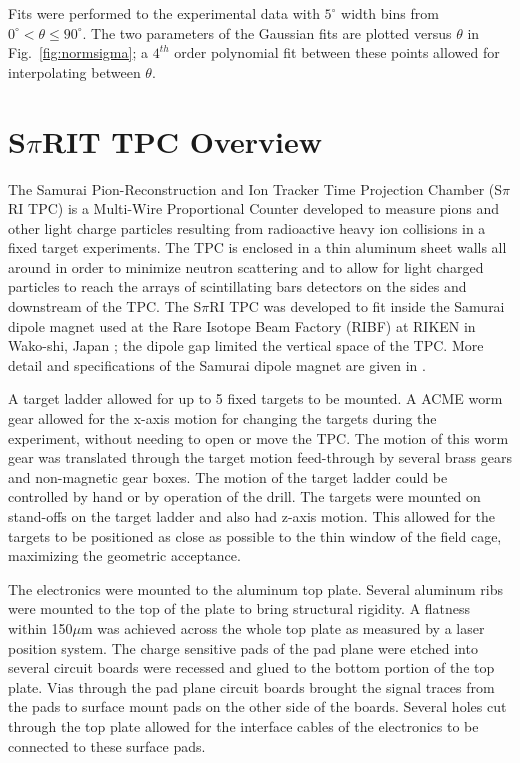 Fits were performed to the experimental data with  $5^{\circ}$ width bins from $0^{\circ} < \theta \leq 90^{\circ}$. The two parameters of the Gaussian fits are plotted versus $\theta$ in Fig.~\ref{fig:normsigma}; a $4^{th}$ order polynomial fit between these points allowed for interpolating between $\theta$.




\section{S$\pi$RIT TPC Overview}
The Samurai Pion-Reconstruction and Ion Tracker Time Projection Chamber (S$\pi$RI TPC) is a Multi-Wire Proportional Counter developed to measure pions and other light charge particles resulting from radioactive heavy ion collisions in a fixed target experiments.  The TPC is enclosed in a thin aluminum sheet walls all around in order to minimize neutron scattering and to allow for light charged particles to reach the arrays of scintillating bars detectors on the sides and downstream of the TPC. The S$\pi$RI TPC was developed to fit inside the Samurai dipole magnet used at the Rare Isotope Beam Factory (RIBF) at RIKEN in Wako-shi, Japan \cite{riken}; the dipole gap limited the vertical space of the TPC. More detail and specifications of the Samurai dipole magnet are given in \cite{samurai}. 

A target ladder allowed for up to 5 fixed targets to be mounted. A ACME worm gear allowed for the x-axis motion for changing the targets during the experiment, without needing to open or move the TPC. The motion of this worm gear was translated through the target motion feed-through by several brass gears and non-magnetic gear boxes. The motion of the target ladder could be controlled by hand or by operation of the drill. The targets were mounted on stand-offs on the target ladder and also had z-axis motion. This allowed for the targets to be positioned as close as possible to the thin window of the field cage, maximizing the geometric acceptance. 

The electronics were mounted to the aluminum top plate. Several aluminum ribs were mounted to the top of the plate to bring structural rigidity. A flatness within 150$\mu$m was achieved across the whole top plate as measured by a laser position system. The charge sensitive pads of the pad plane were etched into several circuit boards were recessed and glued to the bottom portion of the top plate. Vias through the pad plane circuit boards brought the signal traces from the pads to surface mount pads on the other side of the boards. Several holes cut through the top plate allowed for the interface cables of the electronics to be connected to these surface pads. 

